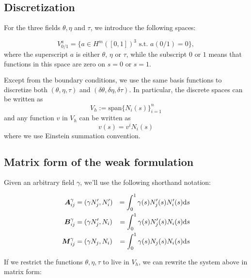 \subsection{Discretization}

For the three fields $\theta, \eta$ and $\tau$, we introduce the
following spaces:

\begin{equation}
  \label{eq:1}
    V^a_{0/1}  = \{ a \in H^m([0,1])^3 \text{ s.t. } a(0/1) = 0\},
\end{equation}
%
where the superscript $a$ is either $\theta$, $\eta$ or $\tau$, while
the subscript $0$ or $1$ means that functions in this space are zero
on $s=0$ or $s=1$.

Except from the boundary conditions, we use the same basis functions
to discretize both $(\theta, \eta, \tau)$ and $(\delta\theta, \delta
\eta, \delta \tau)$. In particular, the discrete spaces can be written
as 
\begin{equation}
  \label{eq:3}
  V_h := \text{span} \{ N_i(s) \}_{i=1}^n
\end{equation}
and any function $v$ in $V_h$ can be written as
$$
v(s)  = v^i N_i(s)
$$
where we use Einstein summation convention.


\subsection{Matrix form of the weak
formulation}\label{matrix-form-of-the-weak-formulation}

Given an arbitrary field \(\gamma\),
we'll use the following shorthand notation:

\begin{equation}
  \label{eq:2}
  \begin{aligned}
    \boldsymbol{A}^\gamma_{ij} & = (\gamma N_j', N_i') &  = \int_0^1 \gamma(s) N_j'(s)
    N_i'(s) \mathrm{d} s \\
    \boldsymbol{B}^\gamma_{ij} & = (\gamma N_j', N_i) & = \int_0^1 \gamma(s) N_j'(s)
    N_i(s) \mathrm{d} s \\
    \boldsymbol{M}^\gamma_{ij} & = (\gamma N_j, N_i) & = \int_0^1 \gamma(s) N_j(s)
    N_i(s) \mathrm{d} s 
  \end{aligned}
\end{equation}

If we restrict the functions $\theta, \eta, \tau$ to live in $V_h$, we
can rewrite the system above in matrix form:


